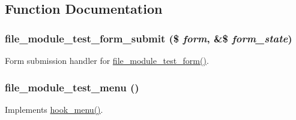 \subsection{Function Documentation}
\hypertarget{file__module__test_8module_a95c4893bdf56f3e4446ed12bcbee36cd}{
\subsubsection[{file\_\-module\_\-test\_\-form\_\-submit}]{\setlength{\rightskip}{0pt plus 5cm}file\_\-module\_\-test\_\-form\_\-submit (\$ {\em form}, \/  \&\$ {\em form\_\-state})}}
\label{file__module__test_8module_a95c4893bdf56f3e4446ed12bcbee36cd}
Form submission handler for \hyperlink{group__forms_ga213f4f5000c3130fa6cd33969c25034e}{file\_\-module\_\-test\_\-form()}. \hypertarget{file__module__test_8module_a0729a89f5c00f71b452f9e7b1d142e2d}{
\subsubsection[{file\_\-module\_\-test\_\-menu}]{\setlength{\rightskip}{0pt plus 5cm}file\_\-module\_\-test\_\-menu ()}}
\label{file__module__test_8module_a0729a89f5c00f71b452f9e7b1d142e2d}
Implements \hyperlink{group__hooks_ga5c95244fea59b25666e409759e133ded}{hook\_\-menu()}. 